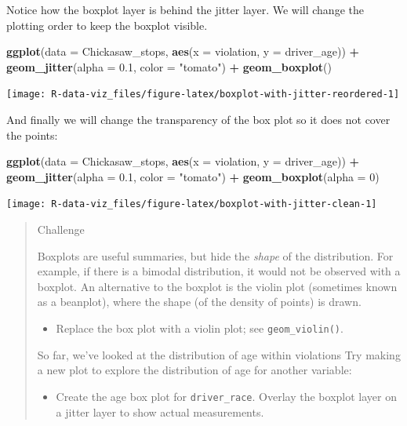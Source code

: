 \documentclass[]{book}
\newenvironment{Shaded}{\begin{snugshade}}{\end{snugshade}}
\newcommand{\KeywordTok}[1]{\textcolor[rgb]{0.13,0.29,0.53}{\textbf{#1}}}
\newcommand{\DataTypeTok}[1]{\textcolor[rgb]{0.13,0.29,0.53}{#1}}
\newcommand{\DecValTok}[1]{\textcolor[rgb]{0.00,0.00,0.81}{#1}}
\newcommand{\FloatTok}[1]{\textcolor[rgb]{0.00,0.00,0.81}{#1}}
\newcommand{\StringTok}[1]{\textcolor[rgb]{0.31,0.60,0.02}{#1}}
\newcommand{\OperatorTok}[1]{\textcolor[rgb]{0.81,0.36,0.00}{\textbf{#1}}}
\newcommand{\NormalTok}[1]{#1}
\providecommand{\tightlist}{%
  \setlength{\itemsep}{0pt}\setlength{\parskip}{0pt}}
\theoremstyle{definition}
\theoremstyle{definition}
\theoremstyle{definition}
\theoremstyle{remark}
\begin{document}
Notice how the boxplot layer is behind the jitter layer. We will change
the plotting order to keep the boxplot visible.

\begin{Shaded}
\begin{Highlighting}[]
\KeywordTok{ggplot}\NormalTok{(}\DataTypeTok{data =}\NormalTok{ Chickasaw_stops, }\KeywordTok{aes}\NormalTok{(}\DataTypeTok{x =}\NormalTok{ violation, }\DataTypeTok{y =}\NormalTok{ driver_age)) }\OperatorTok{+}
\StringTok{    }\KeywordTok{geom_jitter}\NormalTok{(}\DataTypeTok{alpha =} \FloatTok{0.1}\NormalTok{, }\DataTypeTok{color =} \StringTok{"tomato"}\NormalTok{) }\OperatorTok{+}\StringTok{ }
\StringTok{    }\KeywordTok{geom_boxplot}\NormalTok{()}
\end{Highlighting}
\end{Shaded}

\texttt{[image: R-data-viz\_files/figure-latex/boxplot-with-jitter-reordered-1]}

And finally we will change the transparency of the box plot so it does
not cover the points:

\begin{Shaded}
\begin{Highlighting}[]
\KeywordTok{ggplot}\NormalTok{(}\DataTypeTok{data =}\NormalTok{ Chickasaw_stops, }\KeywordTok{aes}\NormalTok{(}\DataTypeTok{x =}\NormalTok{ violation, }\DataTypeTok{y =}\NormalTok{ driver_age)) }\OperatorTok{+}
\StringTok{    }\KeywordTok{geom_jitter}\NormalTok{(}\DataTypeTok{alpha =} \FloatTok{0.1}\NormalTok{, }\DataTypeTok{color =} \StringTok{"tomato"}\NormalTok{) }\OperatorTok{+}
\StringTok{    }\KeywordTok{geom_boxplot}\NormalTok{(}\DataTypeTok{alpha =} \DecValTok{0}\NormalTok{)  }
\end{Highlighting}
\end{Shaded}

\texttt{[image: R-data-viz\_files/figure-latex/boxplot-with-jitter-clean-1]}

\begin{quote}
Challenge

Boxplots are useful summaries, but hide the \emph{shape} of the
distribution. For example, if there is a bimodal distribution, it would
not be observed with a boxplot. An alternative to the boxplot is the
violin plot (sometimes known as a beanplot), where the shape (of the
density of points) is drawn.

\begin{itemize}
\tightlist
\item
  Replace the box plot with a violin plot; see \texttt{geom\_violin()}.
\end{itemize}

So far, we've looked at the distribution of age within violations Try
making a new plot to explore the distribution of age for another
variable:

\begin{itemize}
\tightlist
\item
  Create the age box plot for \texttt{driver\_race}. Overlay the boxplot
  layer on a jitter layer to show actual measurements.
\end{itemize}
\end{quote}
\end{document}
